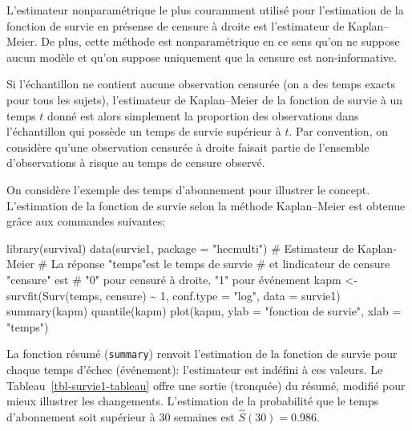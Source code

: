 \documentclass[
  11pt,
  letterpaper,
]{scrbook}
\newenvironment{Shaded}{\begin{snugshade}}{\end{snugshade}}
\newcommand{\AttributeTok}[1]{\textcolor[rgb]{0.40,0.45,0.13}{#1}}
\newcommand{\CommentTok}[1]{\textcolor[rgb]{0.37,0.37,0.37}{#1}}
\newcommand{\DecValTok}[1]{\textcolor[rgb]{0.68,0.00,0.00}{#1}}
\newcommand{\FunctionTok}[1]{\textcolor[rgb]{0.28,0.35,0.67}{#1}}
\newcommand{\NormalTok}[1]{\textcolor[rgb]{0.00,0.23,0.31}{#1}}
\newcommand{\OtherTok}[1]{\textcolor[rgb]{0.00,0.23,0.31}{#1}}
\newcommand{\SpecialCharTok}[1]{\textcolor[rgb]{0.37,0.37,0.37}{#1}}
\newcommand{\StringTok}[1]{\textcolor[rgb]{0.13,0.47,0.30}{#1}}
\theoremstyle{definition}
\theoremstyle{remark}
\begin{document}
L'estimateur nonparamétrique le plus couramment utilisé pour
l'estimation de la fonction de survie en présense de censure à droite
est l'estimateur de Kaplan--Meier. De plus, cette méthode est
nonparamétrique en ce sens qu'on ne suppose aucun modèle et qu'on
suppose uniquement que la censure est non-informative.

Si l'échantillon ne contient aucune observation censurée (on a des temps
exacts pour tous les sujets), l'estimateur de Kaplan--Meier de la
fonction de survie à un temps \(t\) donné est alors simplement la
proportion des observations dans l'échantillon qui possède un temps de
survie supérieur à \(t\). Par convention, on considère qu'une
observation censurée à droite faisait partie de l'ensemble
d'observations à risque au temps de censure observé.

On considère l'exemple des temps d'abonnement pour illustrer le concept.
L'estimation de la fonction de survie selon la méthode Kaplan--Meier est
obtenue grâce aux commandes suivantes:

\begin{Shaded}
\begin{Highlighting}[]
\FunctionTok{library}\NormalTok{(survival)}
\FunctionTok{data}\NormalTok{(survie1, }\AttributeTok{package =} \StringTok{"hecmulti"}\NormalTok{)}
\CommentTok{\# Estimateur de Kaplan{-}Meier}
\CommentTok{\# La réponse "temps"est le temps de survie }
\CommentTok{\# et l\textquotesingle{}indicateur de censure "censure" est}
\CommentTok{\# "0" pour censuré à droite, "1" pour événement}
\NormalTok{kapm }\OtherTok{\textless{}{-}} 
  \FunctionTok{survfit}\NormalTok{(}\FunctionTok{Surv}\NormalTok{(temps, censure) }\SpecialCharTok{\textasciitilde{}} \DecValTok{1}\NormalTok{, }
          \AttributeTok{conf.type =} \StringTok{"log"}\NormalTok{, }
          \AttributeTok{data =}\NormalTok{ survie1)}
\FunctionTok{summary}\NormalTok{(kapm)}
\FunctionTok{quantile}\NormalTok{(kapm)}
\FunctionTok{plot}\NormalTok{(kapm, }
     \AttributeTok{ylab =} \StringTok{"fonction de survie"}\NormalTok{, }
     \AttributeTok{xlab =} \StringTok{"temps"}\NormalTok{) }
\end{Highlighting}
\end{Shaded}

La fonction résumé (\texttt{summary}) renvoit l'estimation de la
fonction de survie pour chaque temps d'échec (événement): l'estimateur
est indéfini à ces valeurs. Le Tableau~\ref{tbl-survie1-tableau} offre
une sortie (tronquée) du résumé, modifié pour mieux illustrer les
changements. L'estimation de la probabilité que le temps d'abonnement
soit supérieur à 30 semaines est \(\widehat{S}(30)=0.986\).
\end{document}
